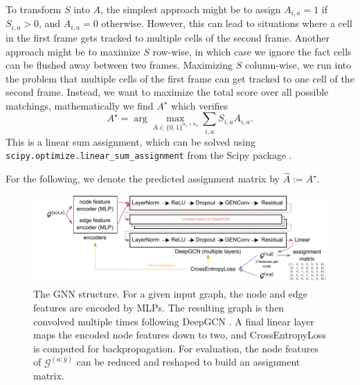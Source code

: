 \documentclass[10pt,conference,compsocconf,a4paper]{IEEEtran}
\newcommand{\G}{\mathcal{G}}
\begin{document}
		To transform $S$ into $A$, the simplest approach might be to assign $A_{i,a} = 1$ if $S_{i,a} > 0$, and $A_{i,a} = 0$ otherwise. However, this can lead to situations where a cell in the first frame gets tracked to multiple cells of the second frame. Another approach might be to maximize $S$ row-wise, in which case we ignore the fact cells can be flushed away between two frames. Maximizing $S$ column-wise, we run into the problem that multiple cells of the first frame can get tracked to one cell of the second frame. Instead, we want to maximize the total score over all possible matchings, mathematically we find $A^\star$ which verifies
		$$
			A^\star = \arg \max_{A \in \{0, 1\}^{n_1 \times n_2}} \sum_{i,a} S_{i,a} A_{i,a}.
		$$
		This is a linear sum assignment, which can be solved using \texttt{scipy.optimize.linear\_sum\_assignment} from the Scipy package \cite{2020SciPy-NMeth}.

		For the following, we denote the predicted assignment matrix by $\hat A := A^\star$.




		\begin{figure}
			\centering
			\includegraphics[width=\linewidth]{figures/nn.v2.pdf}
			\caption{The GNN structure. For a given input graph, the node and edge features are encoded by MLPs. The resulting graph is then convolved multiple times following DeepGCN \cite{li_deepergcn_2020}. A final linear layer maps the encoded node features down to two, and CrossEntropyLoss is computed for backpropagation. For evaluation, the node features of $\G^{(a;\hat y)}$ can be reduced and reshaped to build an assignment matrix.}
			\label{fig:nn}
		\end{figure}
\end{document}
